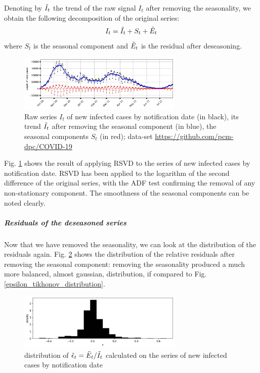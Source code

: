 \documentclass[graybox]{svmult}
\begin{document}
Denoting by $\Tilde{I}_t$ the trend of the raw signal $I_t$ after removing the seasonality, we obtain the following decomposition of the original series:
\begin{equation}
    I_t = \Tilde{I}_t + S_t + \Tilde{E}_t
\end{equation}
where $S_t$ is the seasonal component and $\Tilde{E}_t$ is the residual after deseasoning.

\begin{figure}[t]
\center
\includegraphics[width=0.7\textwidth]{Rt_images/new_cases_deseason.jpg}
\caption{Raw series $I_t$ of new infected cases by notification date (in black), its trend $\Tilde{I}_t$ after removing the seasonal component (in blue), the seasonal components $S_t$ (in red); data-set \href{https://github.com/pcm-dpc/COVID-19}{https://github.com/pcm-dpc/COVID-19}}
\label{new_cases_deseason}
\end{figure}

Fig. \ref{new_cases_deseason} shows the result of applying RSVD to the series of new infected cases by notification date. RSVD has been applied to the logarithm of the second difference of the original series, with the ADF test confirming the removal of any non-stationary component. The smoothness of the seasonal components can be noted clearly.

\subparagraph{Residuals of the deseasoned series}

Now that we have removed the seasonality, we can look at the distribution of the residuals again. Fig. \ref{epsilon_RSVD_distribution} shows the distribution of the relative residuals after removing the seasonal component: removing the seasonality produced a much more balanced, almost gaussian, distribution, if compared to Fig. \ref{epsilon_tikhonov_distribution}.

\begin{figure}[t]
\center
\includegraphics[width=0.7\textwidth]{Rt_images/epsilon_RSVD_distribution.jpg}
\caption{distribution of $\Tilde{\epsilon}_t = \Tilde{E}_t/\Tilde{I}_t$ calculated on the series of new infected cases by notification date}
\label{epsilon_RSVD_distribution}
\end{figure}
\end{document}
